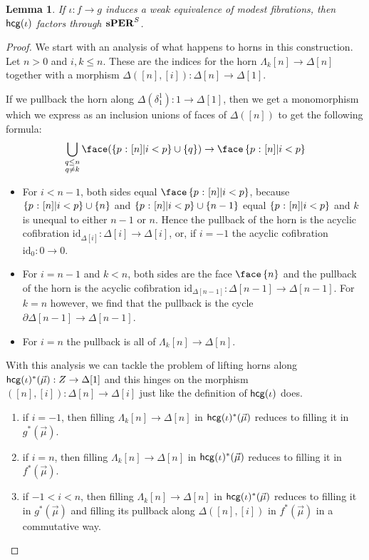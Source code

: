 \documentclass{amsart}
\theoremstyle{plain}
\newtheorem{lemma}[theorem]{Lemma}
\theoremstyle{definition}
\newcommand\set[1]{\left\{#1\right\}}
\newcommand\id{\mathrm{id}}
\newcommand\ri{^*}
\begin{document}
\begin{lemma} If $\iota:f\to g$ induces a weak equivalence of modest fibrations, then $\mathsf{hcg}(\iota)$ factors through $\mathbf{s}\mathbf{PER}^S$. \end{lemma}

\begin{proof} We start with an analysis of what happens to horns in this construction.
Let $n>0$ and $i,k\leq n$. These are the indices for the horn $\Lambda_k[n] \to \Delta[n]$ together with a morphism $\Delta([n],[i]):\Delta[n]\to\Delta[1]$. 

If we pullback the horn along $\Delta(\delta^1_1):1\to \Delta[1]$, then we get a monomorphism which we express as an inclusion unions of faces of $\Delta([n])$ to get the following formula:
\begin{equation}
\bigcup_{\substack{q\leq n\\q\neq k}} \face(\set{p\of[n] | i < p}\cup\set{q}) \to \face\set{p\of[n] | i < p}
\end{equation}
\begin{itemize}
\item For $i<n-1$, both sides equal $\face\set{p\of[n] | i < p}$, because $\set{p\of[n] | i < p}\cup\set{n}$ and $\set{p\of[n] | i < p}\cup\set{n-1}$ equal $\set{p\of[n] | i < p}$ and $k$ is unequal to either $n-1$ or $n$. Hence the pullback of the horn is the acyclic cofibration $\id_{\Delta[i]}: \Delta[i]\to\Delta[i]$, or, if $i=-1$ the acyclic cofibration $\id_0:0\to 0$.
\item For $i=n-1$ and $k<n$, both sides are the face $\face\set{n}$ and the pullback of the horn is the acyclic cofibration $\id_{\Delta[n-1]}: \Delta[n-1]\to\Delta[n-1]$. For $k=n$ however, we find that the pullback is the cycle $\partial \Delta[n-1] \to \Delta[n-1]$.
\item For $i=n$ the pullback is all of $\Lambda_k[n] \to \Delta[n]$.
\end{itemize}

With this analysis we can tackle the problem of lifting horns along $\hcg(\iota)\ri(\vec\mu):Z\to \Delta[1]$ and this hinges on the morphism $([n],[i]):\Delta[n] \to \Delta[i]$ just like the definition of $\mathsf{hcg}(\iota)$ does.

\begin{enumerate}
\item if $i=-1$, then filling $\Lambda_k[n] \to \Delta[n]$ in $\hcg(\iota)\ri(\vec\mu)$ reduces to filling it in $g\ri(\vec\mu)$.
\item if $i=n$, then filling $\Lambda_k[n] \to \Delta[n]$ in $\hcg(\iota)\ri(\vec\mu)$ reduces to filling it in $f\ri(\vec\mu)$.
\item if $-1<i<n$, then filling $\Lambda_k[n] \to \Delta[n]$ in $\hcg(\iota)\ri(\vec\mu)$ reduces to filling it in $g\ri(\vec\mu)$ and filling its pullback along $\Delta([n],[i])$ in $f\ri(\vec\mu)$ in a commutative way.
\end{enumerate}


\end{proof}
\end{document}
